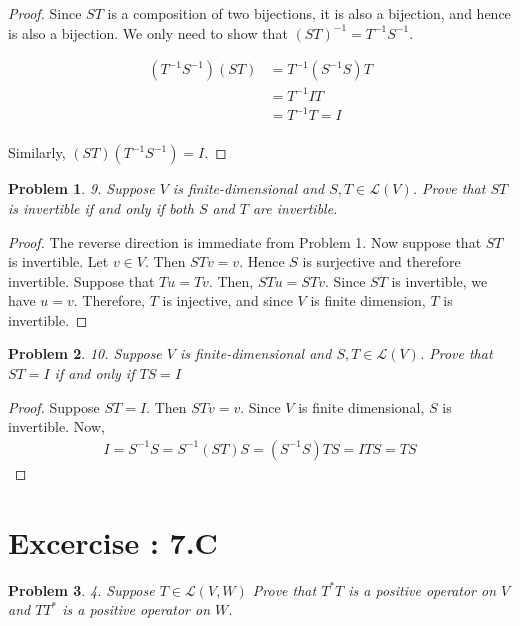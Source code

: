 \documentclass[12pt]{book}
\newtheorem*{problem*}{Problem}
\newcommand{\LL}{\mathcal{L}}
\begin{document}
\begin{proof}
  Since $ST$ is a composition of two bijections, it is also a bijection, and hence is also a bijection. We only need to show that $(ST)^{-1} = T^{-1}S^{-1}$.

  \begin{align*}
    (T^{-1} S^{-1}) (S T) & = T^{-1} (S^{-1} S) T\\
    & = T^{-1} I T\\
    & = T^{-1}T = I \\
  \end{align*}

  Similarly, $(S T) (T^{-1} S^{-1}) = I$.
\end{proof}

\begin{problem*}9. Suppose $V$ is finite-dimensional and $S,T \in \LL(V)$. Prove that $ST$ is invertible if and only if both $S$ and $T$ are invertible.\end{problem*}

\begin{proof}
  The reverse direction is immediate from Problem 1. Now suppose that $ST$ is invertible. Let $v \in V$. Then $STv = v$. Hence $S$ is surjective and therefore invertible. Suppose that $Tu = Tv$. Then, $ST u = ST v$. Since $ST$ is invertible, we have $u = v$. Therefore, $T$ is injective, and since $V$ is finite dimension, $T$ is invertible. 
\end{proof}

\begin{problem*}10. Suppose $V$ is finite-dimensional and $S, T \in \LL(V)$. Prove that $ST = I$ if and only if $TS = I$\end{problem*}

\begin{proof}
  Suppose $ST = I$. Then $STv = v$. Since $V$ is finite dimensional, $S$ is invertible. Now,
  \begin{align*}
    I = S^{-1}S = S^{-1}(ST)S = (S^{-1}S)TS = ITS = TS
  \end{align*}
\end{proof}


\section{Excercise : 7.C}

\begin{problem*}
4. Suppose $T \in \LL(V,W)$ Prove that $T^*T$ is a positive operator on $V$ and $TT^*$ is a positive operator on $W$. 
\end{problem*}
\end{document}
